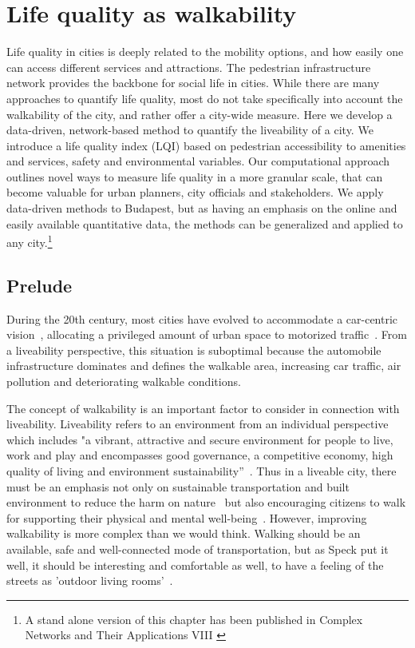 \chapter{Life quality as walkability}

Life quality in cities is deeply related to the mobility options, and how easily one can access different services and attractions. The pedestrian infrastructure network provides the backbone for social life in cities. While there are many approaches to quantify life quality, most do not take specifically into account the walkability of the city, and rather offer a city-wide measure. Here we develop a data-driven, network-based method to quantify the liveability of a city. We introduce a life quality index (LQI) based on pedestrian accessibility to amenities and services, safety and environmental variables. Our computational approach outlines novel ways to measure life quality in a more granular scale, that can become valuable for urban planners, city officials and stakeholders. We apply data-driven methods to Budapest, but as having an emphasis on the online and easily available quantitative data, the methods can be generalized and applied to any city.\footnote{A stand alone version of this chapter has been published in Complex Networks and Their Applications VIII \cite{natera2020walkability} }

\section{Prelude}

During the 20th century, most cities have evolved to accommodate a car-centric vision~\cite{Jacobs1961Death}, allocating a privileged amount of urban space to motorized traffic~\cite{Gossling2016Distribution,Szell2018Crowdsourced}. From a liveability perspective, this situation is suboptimal because the automobile infrastructure dominates and defines the walkable area, increasing car traffic, air pollution and deteriorating walkable conditions.

The concept of walkability is an important factor to consider in connection with liveability. Liveability refers to an environment from an individual perspective~\cite{Heylen2006Liveability} which includes "a vibrant, attractive and secure environment for people to live, work and play and encompasses good governance, a competitive economy, high quality of living and environment sustainability”~\cite{Shamsuddin2012Walkable}. Thus in a liveable city, there must be an emphasis not only on sustainable transportation and built environment to reduce the harm on nature~\cite{Campbell1996Green,Jabareen2013Planning} but also encouraging citizens to walk for supporting their physical and mental well-being~\cite{Frank2006Many}. However, improving walkability is more complex than we would think. Walking should be an available, safe and well-connected mode of transportation, but as Speck put it well, it should be interesting and comfortable as well, to have a feeling of the streets as ’outdoor living rooms’~\cite{Speck2012Walkability}.

